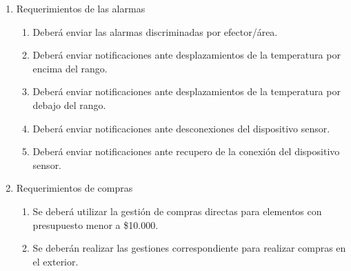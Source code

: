\begin{enumerate}
\item Requerimientos de las alarmas
	\begin{enumerate}
	\item Deberá enviar las alarmas discriminadas por efector/área.
	\item Deberá enviar notificaciones ante desplazamientos de la temperatura por encima del rango.
	\item Deberá enviar notificaciones ante desplazamientos de la temperatura por debajo del rango.
	\item Deberá enviar notificaciones ante desconexiones del dispositivo sensor.
	\item Deberá enviar notificaciones ante recupero de la conexión del dispositivo sensor.
	 \end{enumerate}	 

\item Requerimientos de compras
	\begin{enumerate}
	\item Se deberá utilizar la gestión de compras directas para elementos con presupuesto menor a {\$10.000}.
	\item Se deberán realizar las gestiones correspondiente para realizar compras en el exterior.
	\end{enumerate}
\end{enumerate}








